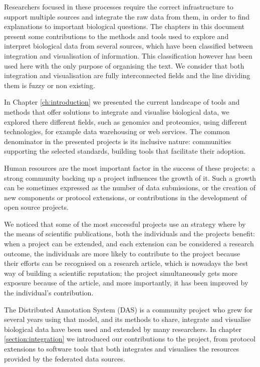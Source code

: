 Researchers focused in these processes require the correct infrastructure to support multiple sources and integrate the raw data from them, in order to find explanations to important biological questions. The chapters in this document present some contributions to the methods and tools used to explore and interpret biological data from several sources, which have been classified between integration and visualisation of information. This classification however has been used here with the only purpose of organising the text. We consider that both integration and visualisation are fully interconnected fields and the line dividing them is fuzzy or non existing.

\vspace{5mm}

In Chapter \ref{ch:introduction} we presented the current landscape of tools and methods that offer solutions to integrate and visualise biological data, we explored there different fields, such as genomics and proteomics, using different technologies, for example data warehousing or web services. The common denominator in the presented projects is its inclusive nature: communities supporting the selected standards, building tools that facilitate their adoption. 

Human resources are the most important factor in the success of these projects: a strong community backing up a project influences the growth of it. Such a growth can be sometimes expressed as the number of data submissions, or the creation of new components or protocol extensions, or contributions in the 
development of open source projects.

We noticed that some of the most successful projects use an strategy where by the means of scientific publications, both the individuals and the projects  benefit: when a project can be extended, and each extension can be considered a research outcome, the individuals are more likely to contribute to the project because their efforts can be recognised on a research article, which is nowadays the best way of building a scientific reputation; the project simultaneously gets more exposure because of the article, and more importantly, it has been improved by the individual's contribution.

\vspace{5mm}

The Distributed Annotation System (DAS) is a community project who grew for several years using that model, and its methods to share, integrate and visualise biological data have been used and extended by many researchers. In chapter \ref{section:integration} we introduced our contributions to the project, from protocol extensions to software tools that both integrates and visualises the resources provided by the federated data sources.

